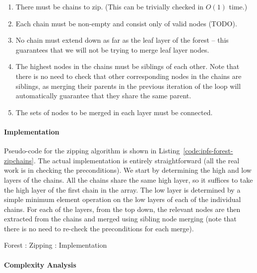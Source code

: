 \begin{enumerate}

\item There must be chains to zip. (This can be trivially checked in $O(1)$ time.)
\item Each chain must be non-empty and consist only of valid nodes (TODO).
\item No chain must extend down as far as the leaf layer of the forest -- this guarantees that we will not be trying to merge leaf layer nodes.
\item The highest nodes in the chains must be siblings of each other. Note that there is no need to check that other corresponding nodes in the chains are siblings, as merging their parents in the previous iteration of the loop will automatically guarantee that they share the same parent.
\item The sets of nodes to be merged in each layer must be connected.

\end{enumerate}

\paragraph{Implementation}

Pseudo-code for the zipping algorithm is shown in Listing~\ref{code:ipfs-forest-zipchains}. The actual implementation is entirely straightforward (all the real work is in checking the preconditions). We start by determining the high and low layers of the chains. All the chains share the same high layer, so it suffices to take the high layer of the first chain in the array. The low layer is determined by a simple minimum element operation on the low layers of each of the individual chains. For each of the layers, from the top down, the relevant nodes are then extracted from the chains and merged using sibling node merging (note that there is no need to re-check the preconditions for each merge).

\begin{stulisting}[p]
\caption{Forest : Zipping : Implementation}
\label{code:ipfs-forest-zipchains}

\end{stulisting}

\paragraph{Complexity Analysis}

